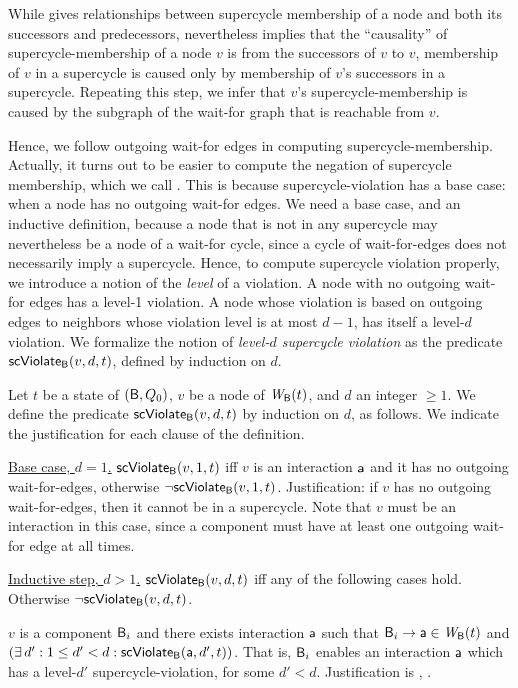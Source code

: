 While  gives relationships between supercycle membership of a node and both its
successors and predecessors, nevertheless  implies that the ``causality'' of
supercycle-membership of a node $v$ is from the successors of $v$ to $v$, \ie membership of $v$ in a
supercycle is caused only by membership of $v$'s successors in a supercycle. Repeating this step, we
infer that $v$'s supercycle-membership is caused by the subgraph of the wait-for graph that is
reachable from $v$.

Hence, we follow outgoing wait-for edges in computing supercycle-membership. Actually, it turns out
to be easier to compute the negation of supercycle membership, which we call . This is because supercycle-violation has a base case: when a node has no outgoing
wait-for edges. We need a base case, and an inductive definition, because 
a node that is not in any supercycle may nevertheless be a node of a wait-for cycle, since a cycle
of wait-for-edges does not necessarily imply a supercycle. Hence, to compute supercycle violation
properly, we introduce a notion of the \emph{level} of a violation. A node with no
outgoing wait-for edges has a level-1 violation. A node whose violation is based on outgoing edges
to neighbors whose violation level is at most $d-1$, has itself a level-$d$ violation. We
formalize the notion of \emph{level-$d$ supercycle violation} as the predicate $\mathsf{scViolate}_{\mathsf{B}}(v,d,t)$,
defined by induction on $d$.


\label{def:supercycle-violation}
\label{def:supercycle.violation}
Let $t$ be a state of $(\mathsf{B}, Q_0)$, $v$ be a node of $\mathit{W}_{\mathsf{B}}({t})$, and $d$ an integer $\ge 1$.
We define the predicate $\mathsf{scViolate}_{\mathsf{B}}(v,d,t)$ by induction on $d$, as follows. We indicate the
justification for each clause of the definition.

\noindent
\ul{Base case, $d=1$.} $\mathsf{scViolate}_{\mathsf{B}}(v,1,t)$ iff $v$ is an interaction $\mathsf{a}$ and it has no outgoing wait-for-edges, otherwise $\neg \mathsf{scViolate}_{\mathsf{B}}(v,1,t)$.
%
Justification: if $v$ has no outgoing wait-for-edges, then it cannot be in a supercycle.  Note that $v$ must be an
interaction in this case, since a component must have at least one outgoing wait-for edge at all times.

\noindent
\ul{Inductive step, $d > 1$.}  $\mathsf{scViolate}_{\mathsf{B}}(v,d,t)$ iff any of the following cases hold. Otherwise $\neg \mathsf{scViolate}_{\mathsf{B}}(v,d,t)$.
%
\bn

\item  \label{def:supercycle.violation.component.out}
$v$ is a component $\mathsf{B}_i$ and there exists interaction $\mathsf{a}$ such that $\mathsf{B}_i \rightarrow \mathsf{a} \in \mathit{W}_{\mathsf{B}}({t})$ and $(\exists\, d' : 1 \le d' < d: \mathsf{scViolate}_{\mathsf{B}}(\mathsf{a},d',t))$.
That is, $\mathsf{B}_i$ enables an interaction $\mathsf{a}$ which has a level-$d'$ supercycle-violation, for some $d' < d$.
Justification is , .


